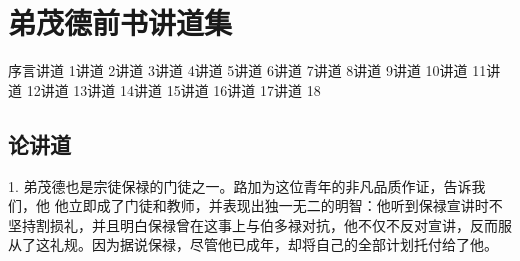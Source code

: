 
\chapter{弟茂德前书讲道集}


序言\newline{}讲道 1\newline{}讲道 2\newline{}讲道 3\newline{}讲道 4\newline{}讲道 5\newline{}讲道 6\newline{}讲道 7\newline{}讲道 8\newline{}讲道 9\newline{}讲道 10\newline{}讲道 11\newline{}讲道 12\newline{}讲道 13\newline{}讲道 14\newline{}讲道 15\newline{}讲道 16\newline{}讲道 17\newline{}讲道 18\par



\section{论讲道}

1. 弟茂德也是宗徒保禄的门徒之一。路加为这位青年的非凡品质作证，告诉我们，他 他立即成了门徒和教师，并表现出独一无二的明智：他听到保禄宣讲时不坚持割损礼，并且明白保禄曾在这事上与伯多禄对抗，他不仅不反对宣讲，反而服从了这礼规。因为据说保禄，尽管他已成年，却将自己的全部计划托付给了他。\par

